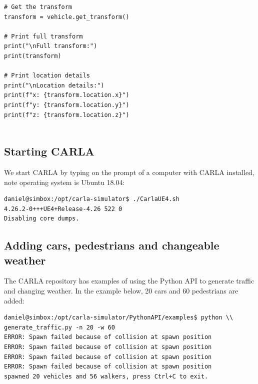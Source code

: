 \begin{verbatim}
# Get the transform
transform = vehicle.get_transform()

# Print full transform
print("\nFull transform:")
print(transform)

# Print location details
print("\nLocation details:")
print(f"x: {transform.location.x}")
print(f"y: {transform.location.y}")
print(f"z: {transform.location.z}")


\end{verbatim}

\subsection{Starting CARLA}

We start CARLA by typing on the prompt of a computer with CARLA installed, note operating system is Ubuntu 18.04:


\begin{verbatim}
daniel@simbox:/opt/carla-simulator$ ./CarlaUE4.sh 
4.26.2-0+++UE4+Release-4.26 522 0
Disabling core dumps.
\end{verbatim}

\subsection{Adding cars, pedestrians and changeable weather}

The CARLA repository has examples of using the Python API to generate traffic and changing weather. In the example below, 20 cars and 60 pedestrians are added:

\begin{verbatim}
daniel@simbox:/opt/carla-simulator/PythonAPI/examples$ python \\
generate_traffic.py -n 20 -w 60
ERROR: Spawn failed because of collision at spawn position
ERROR: Spawn failed because of collision at spawn position
ERROR: Spawn failed because of collision at spawn position
ERROR: Spawn failed because of collision at spawn position
spawned 20 vehicles and 56 walkers, press Ctrl+C to exit.
\end{verbatim}


